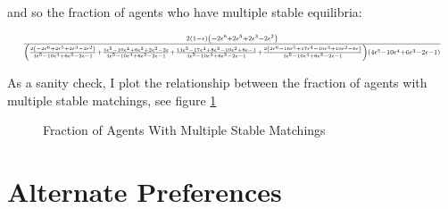 \documentclass[WP]{AEA}
\begin{document}
and so the fraction of agents who have multiple stable equilibria:

\begin{equation*}
	\resizebox{\textwidth}{!}{
	$
			\frac{2 \left(1 - \epsilon\right) \left(- 2 \epsilon^{6} + 2 \epsilon^{5} + 2 \epsilon^{3} - 2 \epsilon^{2}\right)}{\left(\frac{2 \left(- 2 \epsilon^{6} + 2 \epsilon^{5} + 2 \epsilon^{3} - 2 \epsilon^{2}\right)}{4 \epsilon^{5} - 10 \epsilon^{4} + 6 \epsilon^{3} - 2 \epsilon - 1} + \frac{4 \epsilon^{5} - 10 \epsilon^{4} + 6 \epsilon^{3} + 2 \epsilon^{2} - 2 \epsilon}{4 \epsilon^{5} - 10 \epsilon^{4} + 6 \epsilon^{3} - 2 \epsilon - 1} + \frac{14 \epsilon^{5} - 17 \epsilon^{4} + 8 \epsilon^{3} - 10 \epsilon^{2} + 6 \epsilon - 1}{4 \epsilon^{5} - 10 \epsilon^{4} + 6 \epsilon^{3} - 2 \epsilon - 1} + \frac{2 \left(2 \epsilon^{6} - 16 \epsilon^{5} + 17 \epsilon^{4} - 10 \epsilon^{3} + 10 \epsilon^{2} - 6 \epsilon\right)}{4 \epsilon^{5} - 10 \epsilon^{4} + 6 \epsilon^{3} - 2 \epsilon - 1}\right) \left(4 \epsilon^{5} - 10 \epsilon^{4} + 6 \epsilon^{3} - 2 \epsilon - 1\right)}
	$
}
\end{equation*}

As a sanity check, I plot the relationship between the fraction of agents with multiple stable matchings, see figure \ref{fig:multi_match}

\begin{figure}[p]{Fraction of Agents With Multiple Stable Matchings}\label{fig:multi_match}
\end{figure}

\section{Alternate Preferences}
\end{document}
